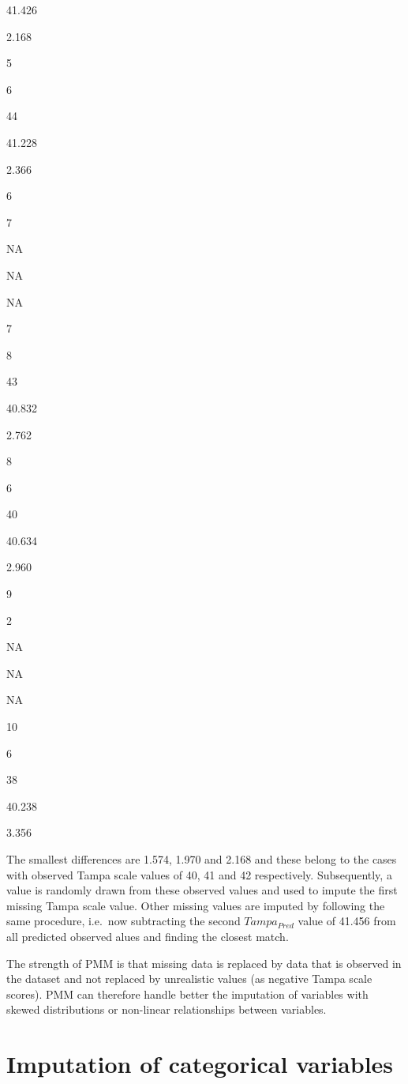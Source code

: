\documentclass[
]{book}
\begin{document}
41.426

2.168

5

6

44

41.228

2.366

6

7

NA

NA

NA

7

8

43

40.832

2.762

8

6

40

40.634

2.960

9

2

NA

NA

NA

10

6

38

40.238

3.356

The smallest differences are 1.574, 1.970 and 2.168 and these belong to the cases with observed Tampa scale values of 40, 41 and 42 respectively. Subsequently, a value is randomly drawn from these observed values and used to impute the first missing Tampa scale value. Other missing values are imputed by following the same procedure, i.e.~now subtracting the second \(Tampa_{Pred}\) value of 41.456 from all predicted observed alues and finding the closest match.

The strength of PMM is that missing data is replaced by data that is observed in the dataset and not replaced by unrealistic values (as negative Tampa scale scores). PMM can therefore handle better the imputation of variables with skewed distributions or non-linear relationships between variables.

\hypertarget{imputation-of-categorical-variables}{%
\section{Imputation of categorical variables}\label{imputation-of-categorical-variables}}
\end{document}
